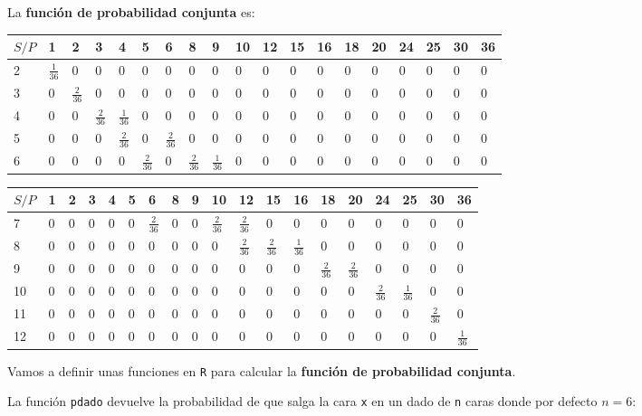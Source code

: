 \documentclass[]{book}
\newenvironment{Shaded}{\begin{snugshade}}{\end{snugshade}}
\newcommand{\ControlFlowTok}[1]{\textcolor[rgb]{0.13,0.29,0.53}{\textbf{#1}}}
\newcommand{\DataTypeTok}[1]{\textcolor[rgb]{0.13,0.29,0.53}{#1}}
\newcommand{\DecValTok}[1]{\textcolor[rgb]{0.00,0.00,0.81}{#1}}
\newcommand{\KeywordTok}[1]{\textcolor[rgb]{0.13,0.29,0.53}{\textbf{#1}}}
\newcommand{\NormalTok}[1]{#1}
\newcommand{\OperatorTok}[1]{\textcolor[rgb]{0.81,0.36,0.00}{\textbf{#1}}}
\newcommand{\StringTok}[1]{\textcolor[rgb]{0.31,0.60,0.02}{#1}}
\begin{document}
La \textbf{función de probabilidad conjunta} es:

\begin{longtable}[]{@{}lllllllllllllllllll@{}}
\toprule
\(S/P\) & 1 & 2 & 3 & 4 & 5 & 6 & 8 & 9 & 10 & 12 & 15 & 16 & 18 & 20 & 24 & 25 & 30 & 36\tabularnewline
\midrule
\endhead
2 & \(\frac{1}{36}\) & 0 & 0 & 0 & 0 & 0 & 0 & 0 & 0 & 0 & 0 & 0 & 0 & 0 & 0 & 0 & 0 & 0\tabularnewline
3 & 0 & \(\frac{2}{36}\) & 0 & 0 & 0 & 0 & 0 & 0 & 0 & 0 & 0 & 0 & 0 & 0 & 0 & 0 & 0 & 0\tabularnewline
4 & 0 & 0 & \(\frac{2}{36}\) & \(\frac{1}{36}\) & 0 & 0 & 0 & 0 & 0 & 0 & 0 & 0 & 0 & 0 & 0 & 0 & 0 & 0\tabularnewline
5 & 0 & 0 & 0 & \(\frac{2}{36}\) & 0 & \(\frac{2}{36}\) & 0 & 0 & 0 & 0 & 0 & 0 & 0 & 0 & 0 & 0 & 0 & 0\tabularnewline
6 & 0 & 0 & 0 & 0 & \(\frac{2}{36}\) & 0 & \(\frac{2}{36}\) & \(\frac{1}{36}\) & 0 & 0 & 0 & 0 & 0 & 0 & 0 & 0 & 0 & 0\tabularnewline
\bottomrule
\end{longtable}

\begin{longtable}[]{@{}lllllllllllllllllll@{}}
\toprule
\(S/P\) & 1 & 2 & 3 & 4 & 5 & 6 & 8 & 9 & 10 & 12 & 15 & 16 & 18 & 20 & 24 & 25 & 30 & 36\tabularnewline
\midrule
\endhead
7 & 0 & 0 & 0 & 0 & 0 & \(\frac{2}{36}\) & 0 & 0 & \(\frac{2}{36}\) & \(\frac{2}{36}\) & 0 & 0 & 0 & 0 & 0 & 0 & 0 & 0\tabularnewline
8 & 0 & 0 & 0 & 0 & 0 & 0 & 0 & 0 & 0 & \(\frac{2}{36}\) & \(\frac{2}{36}\) & \(\frac{1}{36}\) & 0 & 0 & 0 & 0 & 0 & 0\tabularnewline
9 & 0 & 0 & 0 & 0 & 0 & 0 & 0 & 0 & 0 & 0 & 0 & 0 & \(\frac{2}{36}\) & \(\frac{2}{36}\) & 0 & 0 & 0 & 0\tabularnewline
10 & 0 & 0 & 0 & 0 & 0 & 0 & 0 & 0 & 0 & 0 & 0 & 0 & 0 & 0 & \(\frac{2}{36}\) & \(\frac{1}{36}\) & 0 & 0\tabularnewline
11 & 0 & 0 & 0 & 0 & 0 & 0 & 0 & 0 & 0 & 0 & 0 & 0 & 0 & 0 & 0 & 0 & \(\frac{2}{36}\) & 0\tabularnewline
12 & 0 & 0 & 0 & 0 & 0 & 0 & 0 & 0 & 0 & 0 & 0 & 0 & 0 & 0 & 0 & 0 & 0 & \(\frac{1}{36}\)\tabularnewline
\bottomrule
\end{longtable}

Vamos a definir unas funciones en \texttt{R} para calcular la \textbf{función de probabilidad conjunta}.

La función \texttt{pdado} devuelve la probabilidad de que salga la cara \texttt{x} en un dado de \texttt{n} caras donde por defecto \(n=6\):

\begin{Shaded}
\end{Shaded}
\end{document}
